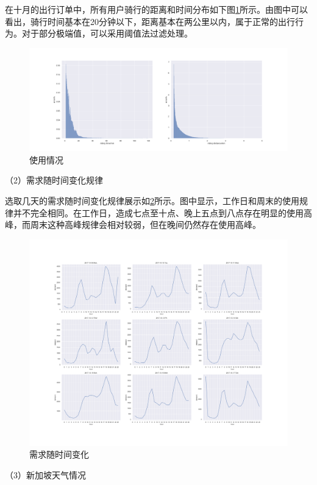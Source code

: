 \documentclass[]{tongjithesis}
\numberwithin{equation}{chapter}
\begin{document}
在十月的出行订单中，所有用户骑行的距离和时间分布如下图\ref{distime}所示。由图中可以看出，骑行时间基本在20分钟以下，距离基本在两公里以内，属于正常的出行行为。对于部分极端值，可以采用阈值法过滤处理。
\begin{figure}[ht!]
	\centering
	\includegraphics[width= 1.0 \textwidth]{figures_main/dis_time.png}
	\caption{使用情况}
	\label{distime}
\end{figure}

（2）需求随时间变化规律

选取几天的需求随时间变化规律展示如\ref{demand}所示。图中显示，工作日和周末的使用规律并不完全相同。在工作日，造成七点至十点、晚上五点到八点存在明显的使用高峰，而周末这种高峰规律会相对较弱，但在晚间仍然存在使用高峰。
\begin{figure}[ht!]
	\centering
	\includegraphics[width= 1.0 \textwidth]{figures_main/week_demand.png}
	\caption{需求随时间变化}
	\label{demand}
\end{figure}

（3）新加坡天气情况
\end{document}
